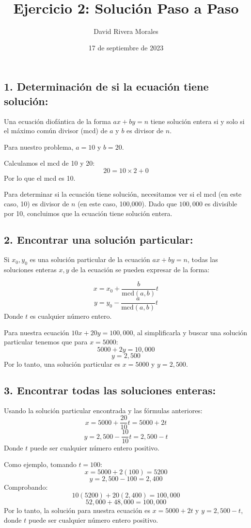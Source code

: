 \documentclass[12pt,a4paper]{article}
\author{David Rivera Morales}
\title{Ejercicio 2: Solución Paso a Paso}
\date{17 de septiembre de 2023}
\begin{document}
\maketitle

\subsection*{1. Determinación de si la ecuación tiene solución:}
Una ecuación diofántica de la forma \( ax + by = n \) tiene solución entera si y solo si el máximo común divisor (mcd) de \( a \) y \( b \) es divisor de \( n \). 

Para nuestro problema, \( a = 10 \) y \( b = 20 \). 

Calculamos el mcd de 10 y 20:
\[ 20 = 10 \times 2 + 0 \]
Por lo que el mcd es 10.

Para determinar si la ecuación tiene solución, necesitamos ver si el mcd (en este caso, 10) es divisor de \( n \) (en este caso, 100,000). Dado que \( 100,000 \) es divisible por 10, concluimos que la ecuación tiene solución entera.

\subsection*{2. Encontrar una solución particular:}
Si \( x_0, y_0 \) es una solución particular de la ecuación \( ax + by = n \), todas las soluciones enteras \( x, y \) de la ecuación se pueden expresar de la forma:

\[ x = x_0 + \frac{b}{\text{mcd}(a,b)} t \]
\[ y = y_0 - \frac{a}{\text{mcd}(a,b)} t \]
Donde \( t \) es cualquier número entero.

Para nuestra ecuación \( 10x + 20y = 100,000 \), al simplificarla y buscar una solución particular tenemos que para \( x = 5000 \):
\[ 5000 + 2y = 10,000 \]
\[ y = 2,500 \]
Por lo tanto, una solución particular es \( x = 5000 \) y \( y = 2,500 \).
\subsection*{3. Encontrar todas las soluciones enteras:}
Usando la solución particular encontrada y las fórmulas anteriores:
\[ x = 5000 + \frac{20}{10} t = 5000 + 2t \]
\[ y = 2,500 - \frac{10}{10} t = 2,500 - t \]
Donde \( t \) puede ser cualquier número entero positivo.

Como ejemplo, tomando \( t = 100 \):
\[ x = 5000 + 2(100) = 5200 \]
\[ y = 2,500 - 100 = 2,400 \]
Comprobando:
\[ 10(5200) + 20(2,400) = 100,000 \]
\[ 52,000 + 48,000 = 100,000 \]
Por lo tanto, la solución para nuestra ecuación es \( x = 5000 + 2t \) y \( y = 2,500 - t \), donde \( t \) puede ser cualquier número entero positivo. 
\end{document}
